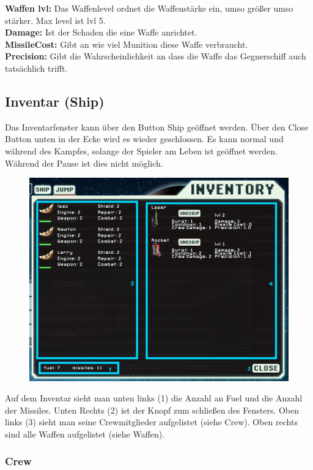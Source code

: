 \documentclass[fontsize=12pt,paper=a4,twoside]{scrartcl}
\begin{document}
\textbf{Waffen lvl:} Das Waffenlevel ordnet die Waffenstärke ein, umso größer umso stärker. Max level ist lvl 5.
\\

\textbf{Damage:} Ist der Schaden die eine Waffe anrichtet.
\\

\textbf{MissileCost:} Gibt an wie viel Munition diese Waffe verbraucht.
\\

\textbf{Precision:} Gibt die Wahrscheinlichkeit an dass die Waffe das Gegnerschiff auch tatsächlich trifft.

\subsection{Inventar (Ship)}

Das Inventarfenster kann über den Button Ship geöffnet werden. Über den Close Button unten in der Ecke wird es wieder geschlossen. Es kann normal und während des Kampfes, solange der Spieler am Leben ist geöffnet werden. Während der Pause ist dies nicht möglich. 

\begin{figure}[H]
\centering
\includegraphics[width=0.8\linewidth]{DasSpiel/Inventar/inventar.png}
\end{figure} 

Auf dem Inventar sieht man unten links (1) die Anzahl an Fuel und die Anzahl der Missiles. Unten Rechts (2) ist der Knopf zum schließen des Fensters. Oben links (3) sieht man seine Crewmitglieder aufgelistet (siehe Crew). Oben rechts sind alle Waffen aufgelistet (siehe Waffen). 

\subsubsection{Crew}\label{sec:Crew}
\end{document}
